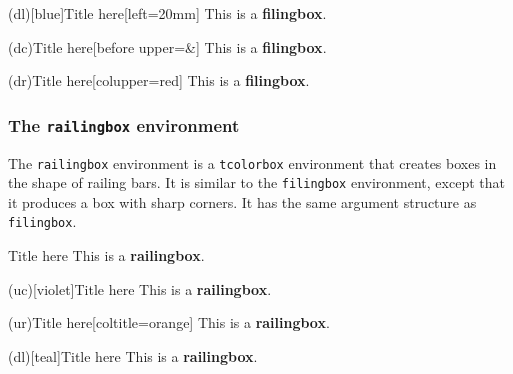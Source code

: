 \documentclass[10pt]{extarticle}
\newcommand{\<}{\langle}
\renewcommand{\>}{\rangle}
\theoremstyle{mystyle}{\newtheorem*{remark}{Remark}}
\theoremstyle{mystyle}{\newtheorem*{remarks}{Remarks}}
\theoremstyle{mystyle}{\newtheorem*{example}{Example}}
\theoremstyle{mystyle}{\newtheorem*{examples}{Examples}}
\theoremstyle{definition}{\newtheorem*{exercise}{Exercise}}
\theoremstyle{warn}
\begin{document}
\begin{verbbox}
\begin{filingbox}(dl)[blue]{Title here}[left=20mm]
This is a \textbf{filingbox}.
\end{filingbox}
\end{verbbox}

\begin{verbbox}
\begin{filingbox}(dc){Title here}[before upper=\&]
This is a \textbf{filingbox}.
\end{filingbox}
\end{verbbox}

\begin{verbbox}
\begin{filingbox}(dr){Title here}[colupper=red]
This is a \textbf{filingbox}.
\end{filingbox}
\end{verbbox}

\subsubsection*{The \texttt{railingbox} environment}

The \texttt{railingbox} environment is a \texttt{tcolorbox} environment that creates boxes in the shape of railing bars. It is similar to the \texttt{filingbox} environment, except that it produces a box with sharp corners. It has the same argument structure as \texttt{filingbox}.

\begin{verbbox}
\begin{railingbox}{Title here}
This is a \textbf{railingbox}.
\end{railingbox}
\end{verbbox}

\begin{verbbox}
\begin{railingbox}(uc)[violet]{Title here}
This is a \textbf{railingbox}.
\end{railingbox}
\end{verbbox}

\begin{verbbox}
\begin{railingbox}(ur){Title here}[coltitle=orange]
This is a \textbf{railingbox}.
\end{railingbox}
\end{verbbox}

\begin{verbbox}
\begin{railingbox}(dl)[teal]{Title here}
This is a \textbf{railingbox}.
\end{railingbox}
\end{verbbox}
\end{document}
